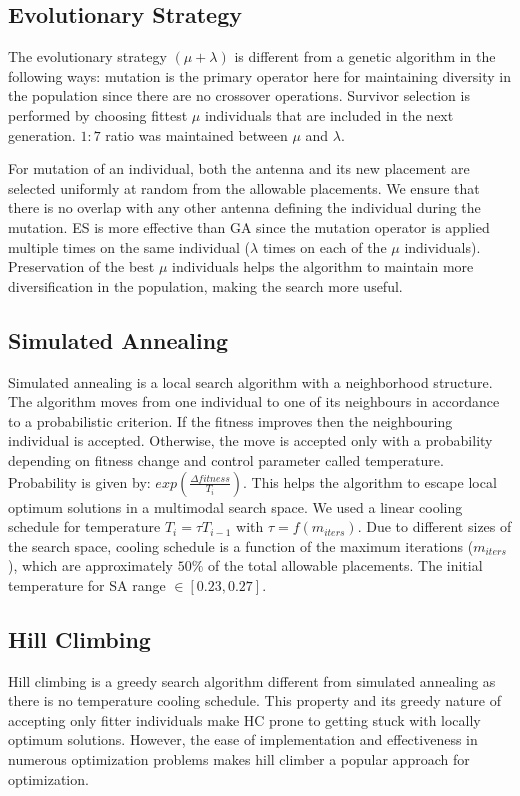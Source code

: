 \documentclass[conference]{IEEEtran}
\begin{document}
\subsection{Evolutionary Strategy}
\label{sec:algorithms-es}
The evolutionary strategy $(\mu + \lambda)$ is different from a genetic algorithm in the following ways: 
mutation is the primary operator here for maintaining diversity in the population since there are no crossover operations. Survivor selection is performed by choosing fittest $\mu$ individuals that are included in the next generation. $1:7$ ratio was maintained between $\mu$ and $\lambda$. 

For mutation of an individual, both the antenna and its new placement are selected uniformly at random from the allowable placements. We ensure that there is no overlap with any other antenna defining the individual during the mutation. ES is more effective than GA since the mutation operator is applied multiple times on the same individual ($\lambda$ times on each of the $\mu$ individuals). Preservation of the best $\mu$ individuals helps the algorithm to maintain more diversification in the population, making the search more useful.
\subsection{Simulated Annealing}
\label{sec:algoriths-sa}
Simulated annealing is a local search algorithm with a neighborhood structure. The algorithm moves from one individual to one of its neighbours in accordance to a probabilistic criterion. If the fitness improves then the neighbouring individual is accepted. Otherwise, the move is accepted only with a probability depending on fitness change and control parameter called temperature. Probability is given by: $exp( \frac{\Delta fitness}{T_i})$. This helps the algorithm to escape local optimum solutions in a multimodal search space. We used a linear cooling schedule for temperature $T_i = \tau T_{i-1}$ with $\tau = f(m_{iters})$. Due to different sizes of the search space, cooling schedule is a function of the maximum iterations ($m_{iters}$), which are approximately $50\%$ of the total allowable placements. The initial temperature for SA range $\in [0.23, 0.27]$.
\subsection{Hill Climbing}
\label{sec:algoriths-hc}
Hill climbing is a greedy search algorithm different from simulated annealing as there is no temperature cooling schedule. This property and its greedy nature of accepting only fitter individuals make HC prone to getting stuck with locally optimum solutions. However, the ease of implementation and effectiveness in numerous optimization problems \cite{skalak1994} makes hill climber a popular approach for optimization.
\end{document}
